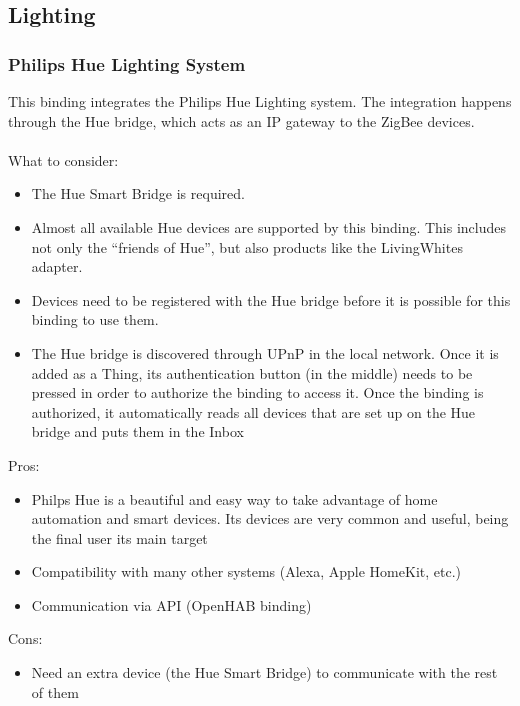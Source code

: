 \subsection{Lighting}

\subsubsection{Philips Hue Lighting System}
This binding integrates the Philips Hue Lighting system. The integration happens through the Hue bridge, which
acts as an IP gateway to the ZigBee devices.\\~\\
What to consider:
\begin{itemize}
	\item The Hue Smart Bridge is required.
	\item Almost all available Hue devices are supported by this binding. This includes not only the “friends of Hue”,
	but also products like the LivingWhites adapter.
	\item Devices need to be registered with the Hue bridge before it is possible for this binding to use them.
	\item The Hue bridge is discovered through UPnP in the local network. Once it is added as a Thing, its authentication
	button (in the middle) needs to be pressed in order to authorize the binding to access it. Once the binding is authorized, 
	it automatically reads all devices that are set up on the Hue bridge and puts them in the Inbox
\end{itemize}
Pros:
\begin{itemize}
	\item Philps Hue is a beautiful and easy way to take advantage of home automation and smart devices. Its devices are very
	common and useful, being the final user its main target
	\item Compatibility with many other systems (Alexa, Apple HomeKit, etc.)
	\item Communication via API (OpenHAB binding)
\end{itemize}
Cons:
\begin{itemize}
	\item Need an extra device (the Hue Smart Bridge) to communicate with the rest of them
\end{itemize}

